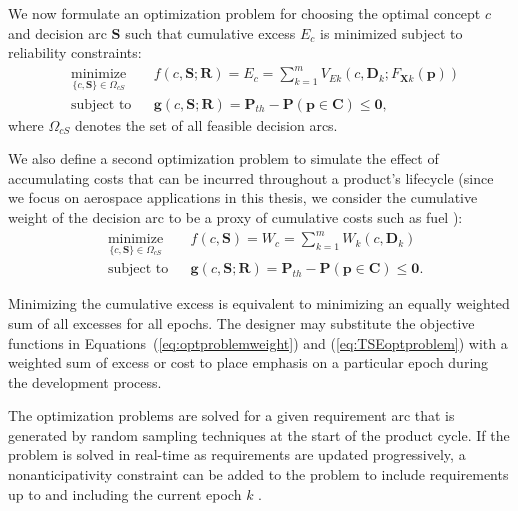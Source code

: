 We now formulate an optimization problem for choosing the optimal concept $c$ and decision arc $\mathbf{S}$ such that cumulative excess $E_c$ is minimized subject to reliability constraints:
%
\begin{equation}
	\label{eq:TSEoptproblem}
	\begin{aligned}
		& \underset{\{c,\mathbf{S}\}\in\Omega_{cS}}{\text{minimize}}
		& & {f}(c,\mathbf{S};\mathbf{R}) = E_c = \sum\limits_{k=1}^{m} V_{Ek}(c,\mathbf{D}_k;F_{\mathbf{X}k}(\mathbf{p}))\\
		& \text{subject to}
		& & \mathbf{g}(c,\mathbf{S};\mathbf{R}) = \mathbf{P}_{th} - \mathbf{P}(\mathbf{p} \in \mathbf{C}) \le \mathbf{0}, 
	\end{aligned}
\end{equation}
%
where $\Omega_{cS}$ denotes the set of all feasible decision arcs.

We also define a second optimization problem to simulate the effect of accumulating costs that can be incurred throughout a product's lifecycle (since we focus on aerospace applications in this thesis, we consider the cumulative weight of the decision arc to be a proxy of cumulative costs such as fuel \cite{Thomsen2016}):
\begin{equation}
	\label{eq:optproblemweight}
	\begin{aligned}
		& \underset{\{c,\mathbf{S}\}\in\Omega_{cS}}{\text{minimize}}
		& & {f}(c,\mathbf{S}) = W_c = \sum\limits_{k=1}^{m} W_{k}(c,\mathbf{D}_k)\\
		& \text{subject to}
		& & \mathbf{g}(c,\mathbf{S};\mathbf{R}) = \mathbf{P}_{th} - \mathbf{P}(\mathbf{p} \in \mathbf{C}) \le \mathbf{0}.
	\end{aligned}
\end{equation}

Minimizing the cumulative excess is equivalent to minimizing an equally weighted sum of all excesses for all epochs. The designer may substitute the objective functions in Equations~(\ref{eq:optproblemweight}) and (\ref{eq:TSEoptproblem}) with a weighted sum of excess or cost to place emphasis on a particular epoch during the development process. 

The optimization problems are solved for a given requirement arc that is generated by random sampling techniques at the start of the product cycle. If the problem is solved in real-time as requirements are updated progressively, a nonanticipativity constraint can be added to the problem to include requirements up to and including the current epoch $k$ \cite{Cardin2017}.

